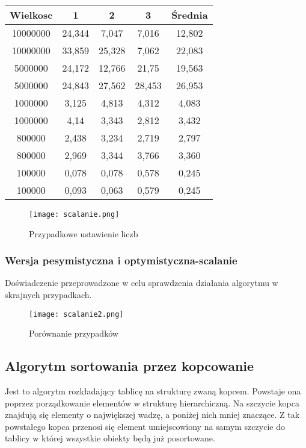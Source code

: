 \documentclass[12pt,a4paper,titlepage]{article}
\begin{document}
\begin{center}
\begin {tabular}{|c|c|c|c|c|}\hline
Wielkosc & 1 & 2 & 3 & Średnia \\\hline
10000000&24,344&7,047&7,016&12,802\\\hline
10000000&33,859&25,328&7,062&22,083\\\hline
5000000&24,172&12,766&21,75&19,563\\\hline
5000000&24,843&27,562&28,453&26,953\\\hline
1000000&3,125&4,813&4,312&4,083\\\hline
1000000&4,14&3,343&2,812&3,432\\\hline
800000&2,438&3,234&2,719&2,797\\\hline
800000&2,969&3,344&3,766&3,360\\\hline
100000&0,078&0,078&0,578&0,245\\\hline
100000&0,093&0,063&0,579&0,245\\\hline
\end{tabular}
\end {center}
\begin{figure}[h]
\begin{center}
\texttt{[image: scalanie.png]}
\caption{Przypadkowe ustawienie liczb}
\end{center}
\end{figure}

\subsubsection{Wersja pesymistyczna i optymistyczna-scalanie}
Doświadczenie przeprowadzone w celu sprawdzenia działania algorytmu w skrajnych przypadkach.


\begin{figure}[h]
\begin{center}
\texttt{[image: scalanie2.png]}
\caption{Porównanie przypadków}
\end{center}
\end{figure}


\newpage
\subsection{Algorytm sortowania przez kopcowanie}
Jest to algorytm rozkładający tablicę na strukturę zwaną kopcem. Powstaje ona poprzez porządkowanie elementów w strukturę hierarchiczną. Na szczycie kopca znajdują się elementy o największej wadzę, a poniżej nich mniej znaczące. Z tak powstałego kopca przenosi się element umiejscowiony na samym szczycie do tablicy w której wszystkie obiekty będą już posortowane.
\end{document}
